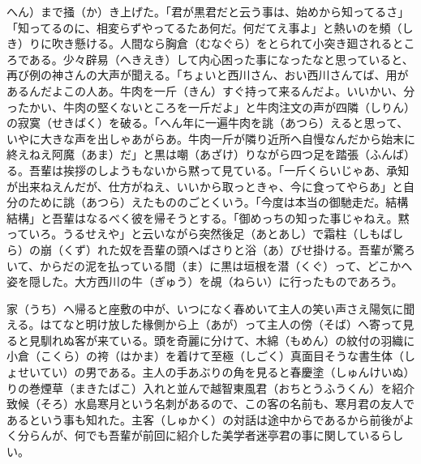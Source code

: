 \documentclass{book}
\begin{document}
へん）まで掻（か）き上げた。「君が黒君だと云う事は、始めから知ってるさ」「知ってるのに、相変らずやってるたあ何だ。何だてえ事よ」と熱いのを頻（しき）りに吹き懸ける。人間なら胸倉（むなぐら）をとられて小突き廻されるところである。少々辟易（へきえき）して内心困った事になったなと思っていると、再び例の神さんの大声が聞える。「ちょいと西川さん、おい西川さんてば、用があるんだよこの人あ。牛肉を一斤（きん）すぐ持って来るんだよ。いいかい、分ったかい、牛肉の堅くないところを一斤だよ」と牛肉注文の声が四隣（しりん）の寂寞（せきばく）を破る。「へん年に一遍牛肉を誂（あつら）えると思って、いやに大きな声を出しゃあがらあ。牛肉一斤が隣り近所へ自慢なんだから始末に終えねえ阿魔（あま）だ」と黒は嘲（あざけ）りながら四つ足を踏張（ふんば）る。吾輩は挨拶のしようもないから黙って見ている。「一斤くらいじゃあ、承知が出来ねえんだが、仕方がねえ、いいから取っときゃ、今に食ってやらあ」と自分のために誂（あつら）えたもののごとくいう。「今度は本当の御馳走だ。結構結構」と吾輩はなるべく彼を帰そうとする。「御めっちの知った事じゃねえ。黙っていろ。うるせえや」と云いながら突然後足（あとあし）で霜柱（しもばしら）の崩（くず）れた奴を吾輩の頭へばさりと浴（あ）びせ掛ける。吾輩が驚ろいて、からだの泥を払っている間（ま）に黒は垣根を潜（くぐ）って、どこかへ姿を隠した。大方西川の牛（ぎゅう）を覘（ねらい）に行ったものであろう。

家（うち）へ帰ると座敷の中が、いつになく春めいて主人の笑い声さえ陽気に聞える。はてなと明け放した椽側から上（あが）って主人の傍（そば）へ寄って見ると見馴れぬ客が来ている。頭を奇麗に分けて、木綿（もめん）の紋付の羽織に小倉（こくら）の袴（はかま）を着けて至極（しごく）真面目そうな書生体（しょせいてい）の男である。主人の手あぶりの角を見ると春慶塗（しゅんけいぬ）りの巻煙草（まきたばこ）入れと並んで越智東風君（おちとうふうくん）を紹介致候（そろ）水島寒月という名刺があるので、この客の名前も、寒月君の友人であるという事も知れた。主客（しゅかく）の対話は途中からであるから前後がよく分らんが、何でも吾輩が前回に紹介した美学者迷亭君の事に関しているらしい。
\end{document}
